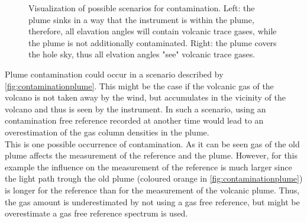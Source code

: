 \begin{figure}
	\centering
	\caption[Visualization of possible scenarios for contamination]{Visualization of possible scenarios for contamination. Left: the plume sinks in a way that the instrument is within the plume, therefore, all elavation angles will contain volcanic trace gases, while the plume is not additionally contaminated. Right: the plume covers the hole sky, thus all elvation angles "see" volcanic trace gases. }
	\label{fig:contaminationplumewideplume}
\end{figure}
%
Plume contamination could occur in a scenario described by  \cref{fig:contaminationplume}.
This might be the case if the volcanic gas of the volcano is not taken away by the wind, but accumulates in the vicinity of the volcano and thus is seen by the instrument. In such a scenario, using an contamination free reference recorded at another time would lead to an overestimation of the gas column densities in the plume.\\
This is one possible occurrence of contamination. As it can be seen gas of the old plume affects the measurement of the reference and the plume. However, for this example the influence on the measurement of the reference is much larger since the light path trough the old plume (coloured orange in \cref{fig:contaminationplume}) is longer for the reference than for the measurement of the volcanic plume. Thus, the gas amount is underestimated by not using a gas free reference, but might be overestimate a gas free reference spectrum is used.

